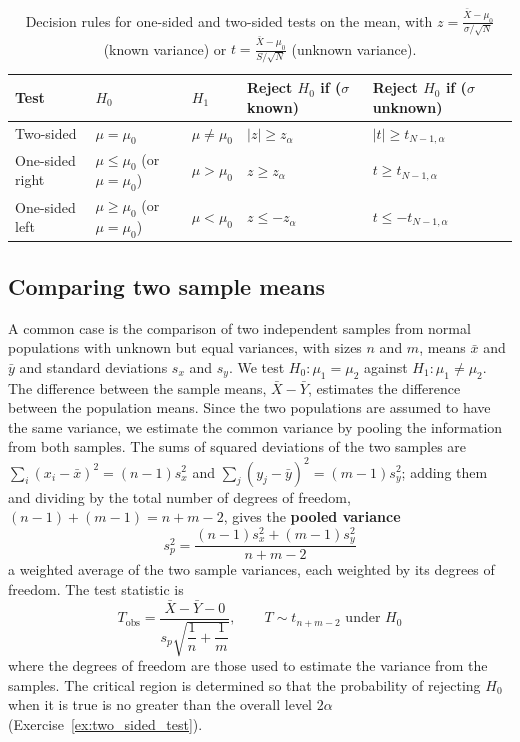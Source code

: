 \documentclass[letterpaper,11pt,leqno]{book}
\begin{document}
\begin{table}[h]
\centering
\caption{Decision rules for one-sided and two-sided tests on the mean, with $z = \frac{\bar{X} - \mu_0}{\sigma/\sqrt{N}}$ (known variance) or $t = \frac{\bar{X} - \mu_0}{S/\sqrt{N}}$ (unknown variance).}
\label{tab:one_two_sided}
\begin{tabular*}{\textwidth}{l@{\extracolsep\fill}llll}
\toprule
Test & $H_0$ & $H_1$ & Reject $H_0$ if ($\sigma$ known) & Reject $H_0$ if ($\sigma$ unknown) \\
\midrule
Two-sided & $\mu = \mu_0$ & $\mu \neq \mu_0$ & $|z| \ge z_\alpha$ & $|t| \ge t_{N-1,\alpha}$ \\
One-sided right & $\mu \le \mu_0$ (or $\mu = \mu_0$) & $\mu > \mu_0$ & $z \ge z_\alpha$ & $t \ge t_{N-1,\alpha}$ \\
One-sided left & $\mu \ge \mu_0$ (or $\mu = \mu_0$) & $\mu < \mu_0$ & $z \le -z_\alpha$ & $t \le -t_{N-1,\alpha}$ \\
\bottomrule
\end{tabular*}
\end{table}

\subsection{Comparing two sample means}

A common case is the comparison of two independent samples from normal populations with unknown but equal variances, with sizes $n$ and $m$, means $\bar{x}$ and $\bar{y}$ and standard deviations $s_x$ and $s_y$. We test $H_0\colon \mu_1 = \mu_2$ against $H_1\colon \mu_1 \neq \mu_2$. The difference between the sample means, $\bar{X} - \bar{Y}$, estimates the difference between the population means. Since the two populations are assumed to have the same variance, we estimate the common variance by pooling the information from both samples. The sums of squared deviations of the two samples are $\sum_i(x_i - \bar{x})^2 = (n - 1)s_x^2$ and $\sum_j(y_j - \bar{y})^2 = (m - 1)s_y^2$; adding them and dividing by the total number of degrees of freedom, $(n - 1) + (m - 1) = n + m - 2$, gives the \textbf{pooled variance}
\begin{equation}
\boxed{s_p^2 = \frac{(n - 1)s_x^2 + (m - 1)s_y^2}{n + m - 2}}
\label{eq:pooled_variance}
\end{equation}
a weighted average of the two sample variances, each weighted by its degrees of freedom. The test statistic is
\begin{equation}
\boxed{T_{\text{obs}} = \frac{\bar{X} - \bar{Y} - 0}{s_p\sqrt{\dfrac{1}{n} + \dfrac{1}{m}}}, \qquad T \sim t_{n+m-2} \text{ under } H_0}
\label{eq:two_sample_t}
\end{equation}
where the degrees of freedom are those used to estimate the variance from the samples. The critical region is determined so that the probability of rejecting $H_0$ when it is true is no greater than the overall level $2\alpha$ (Exercise~\ref{ex:two_sided_test}).
\end{document}

